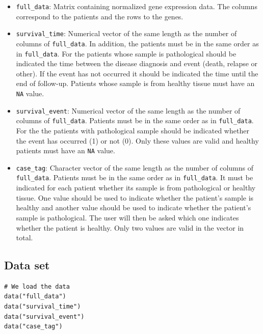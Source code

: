 \begin{itemize}
\tightlist
\item
  \texttt{full\_data}: Matrix containing normalized gene expression data. The columns correspond to the patients and the rows to the genes.
\item
  \texttt{survival\_time}: Numerical vector of the same length as the number of columns of \texttt{full\_data}. In addition, the patients must be in the same order as in \texttt{full\_data}. For the patients whose sample is pathological should be indicated the time between the disease diagnosis and event (death, relapse or other). If the event has not occurred it should be indicated the time until the end of follow-up. Patients whose sample is from healthy tissue must have an \texttt{NA} value.
\item
  \texttt{survival\_event}: Numerical vector of the same length as the number of columns of \texttt{full\_data}. Patients must be in the same order as in \texttt{full\_data}. For the the patients with pathological sample should be indicated whether the event has occurred (1) or not (0). Only these values are valid and healthy patients must have an \texttt{NA} value.
\item
  \texttt{case\_tag}: Character vector of the same length as the number of columns of \texttt{full\_data}. Patients must be in the same order as in \texttt{full\_data}. It must be indicated for each patient whether its sample is from pathological or healthy tissue. One value should be used to indicate whether the patient's sample is healthy and another value should be used to indicate whether the patient's sample is pathological. The user will then be asked which one indicates whether the patient is healthy. Only two values are valid in the vector in total.
\end{itemize}

\hypertarget{section3.1}{%
\subsection{Data set}\label{section3.1}}

\begin{verbatim}
# We load the data
data("full_data")
data("survival_time")
data("survival_event")
data("case_tag")
\end{verbatim}

